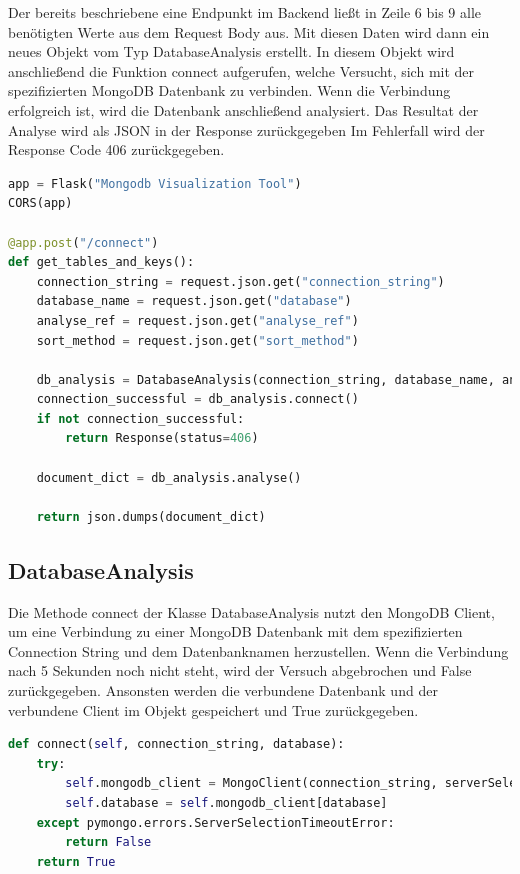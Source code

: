 Der bereits beschriebene eine Endpunkt im Backend ließt in Zeile 6 bis 9 alle benötigten Werte aus dem Request Body aus.
Mit diesen Daten wird dann ein neues Objekt vom Typ DatabaseAnalysis erstellt.
In diesem Objekt wird anschließend die Funktion connect aufgerufen, welche Versucht, sich mit der spezifizierten MongoDB Datenbank zu verbinden.
Wenn die Verbindung erfolgreich ist, wird die Datenbank anschließend analysiert.
Das Resultat der Analyse wird als JSON in der Response zurückgegeben
Im Fehlerfall wird der Response Code 406 zurückgegeben.

\begin{lstlisting}[language=python, caption={app.py},label={lst:backend_app}]
app = Flask("Mongodb Visualization Tool")
CORS(app)

@app.post("/connect")
def get_tables_and_keys():
    connection_string = request.json.get("connection_string")
    database_name = request.json.get("database")
    analyse_ref = request.json.get("analyse_ref")
    sort_method = request.json.get("sort_method")

    db_analysis = DatabaseAnalysis(connection_string, database_name, analyse_ref, sort_method)
    connection_successful = db_analysis.connect()
    if not connection_successful:
        return Response(status=406)

    document_dict = db_analysis.analyse()

    return json.dumps(document_dict)
\end{lstlisting}

\subsection{DatabaseAnalysis}
\label{sub:ba_database_analysis}

Die Methode connect der Klasse DatabaseAnalysis nutzt  den MongoDB Client, um eine Verbindung zu einer MongoDB Datenbank mit dem spezifizierten Connection String und dem Datenbanknamen herzustellen.
Wenn die Verbindung nach 5 Sekunden noch nicht steht, wird der Versuch abgebrochen und False zurückgegeben.
Ansonsten werden die verbundene Datenbank und der verbundene Client im Objekt gespeichert und True zurückgegeben.

\begin{lstlisting}[language=python, caption={DatabaseAnalysis.connect},label={lst:backend_connect}]
def connect(self, connection_string, database):
    try:
        self.mongodb_client = MongoClient(connection_string, serverSelectionTimeoutMS=5000)
        self.database = self.mongodb_client[database]
    except pymongo.errors.ServerSelectionTimeoutError:
        return False
    return True
\end{lstlisting}

